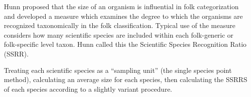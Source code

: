 \documentclass[10pt,letterpaper]{article}
\begin{document}
Hunn proposed that the size of an organism is influential in folk categorization and developed a measure which examines the degree to which the organisms are recognized taxonomically in the folk classification. Typical use of the measure considers how many scientific species are included within each folk-generic or folk-specific level taxon. Hunn called this the Scientific Species Recognition Ratio (SSRR).


Treating each scientific species as a ``sampling unit'' (the single species point method), calculating an average size for each species, then calculating the SSRRS of each species according to a slightly variant procedure.
\end{document}
